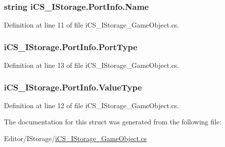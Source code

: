 \hypertarget{structi_c_s___i_storage_1_1_port_info_a410d56f4374863d1dcc39e10d6ca66dd}{
\subsubsection[{Name}]{\setlength{\rightskip}{0pt plus 5cm}string i\+C\+S\+\_\+\+I\+Storage.\+Port\+Info.\+Name}}\label{structi_c_s___i_storage_1_1_port_info_a410d56f4374863d1dcc39e10d6ca66dd}


Definition at line 11 of file i\+C\+S\+\_\+\+I\+Storage\+\_\+\+Game\+Object.\+cs.

\hypertarget{structi_c_s___i_storage_1_1_port_info_a88972b0dee64b6c2263c82783f56d853}{
\subsubsection[{Port\+Type}]{ i\+C\+S\+\_\+\+I\+Storage.\+Port\+Info.\+Port\+Type}}\label{structi_c_s___i_storage_1_1_port_info_a88972b0dee64b6c2263c82783f56d853}


Definition at line 13 of file i\+C\+S\+\_\+\+I\+Storage\+\_\+\+Game\+Object.\+cs.

\hypertarget{structi_c_s___i_storage_1_1_port_info_a2cd13d8721fa23ccd381ee8644402818}{
\subsubsection[{Value\+Type}]{ i\+C\+S\+\_\+\+I\+Storage.\+Port\+Info.\+Value\+Type}}\label{structi_c_s___i_storage_1_1_port_info_a2cd13d8721fa23ccd381ee8644402818}


Definition at line 12 of file i\+C\+S\+\_\+\+I\+Storage\+\_\+\+Game\+Object.\+cs.



The documentation for this struct was generated from the following file\+:\begin{DoxyCompactItemize}
\item 
Editor/\+I\+Storage/\hyperlink{i_c_s___i_storage___game_object_8cs}{i\+C\+S\+\_\+\+I\+Storage\+\_\+\+Game\+Object.\+cs}\end{DoxyCompactItemize}
